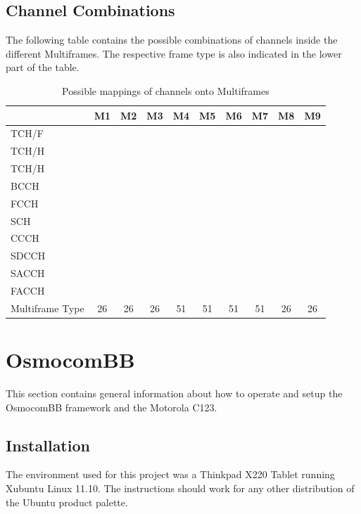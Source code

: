\newpage
\section{Channel Combinations}
\label{sec:combinations}
The following table contains the possible combinations of channels inside the different Multiframes.
The respective frame type is also indicated in the lower part of the table.
\begin{table}[h!]
\centering
\begin{tabular}{lccccccccc}
\toprule
					&M1&M2&M3&M4&M5&M6&M7&M8&M9\\
\midrule
TCH/F				&\cellcolor[gray]{0.7}&&&&&&&\cellcolor[gray]{0.7}&\cellcolor[gray]{0.7}\\
TCH/H				&&\cellcolor[gray]{0.7}&\cellcolor[gray]{0.7}&&&&&&\\
TCH/H				&&&\cellcolor[gray]{0.7}&&&&&&\\
BCCH				&&&&\cellcolor[gray]{0.7}&\cellcolor[gray]{0.7}&\cellcolor[gray]{0.7}&&&\\
FCCH				&&&&\cellcolor[gray]{0.7}&\cellcolor[gray]{0.7}&&&&\\
SCH					&&&&\cellcolor[gray]{0.7}&\cellcolor[gray]{0.7}&&&&\\
CCCH				&&&&\cellcolor[gray]{0.7}&\cellcolor[gray]{0.7}&\cellcolor[gray]{0.7}&&&\\
SDCCH				&&&&&\cellcolor[gray]{0.7}&&\cellcolor[gray]{0.7}&&\\
SACCH				&\cellcolor[gray]{0.7}&\cellcolor[gray]{0.7}&\cellcolor[gray]{0.7}&&\cellcolor[gray]{0.7}&&\cellcolor[gray]{0.7}&\cellcolor[gray]{0.7}&\cellcolor[gray]{0.7}\\
FACCH				&\cellcolor[gray]{0.7}&\cellcolor[gray]{0.7}&\cellcolor[gray]{0.7}&&&&&\cellcolor[gray]{0.7}&\\
\midrule
Multiframe Type		&26&26&26&51&51&51&51&26&26\\
\bottomrule
\end{tabular}
\caption{Possible mappings of channels onto Multiframes}
\end{table}

\chapter{OsmocomBB}
This section contains general information about how to operate and setup the OsmocomBB framework and the Motorola C123.
\section{Installation}
\label{sec:osmo_install}
The environment used for this project was a Thinkpad X220 Tablet running Xubuntu Linux 11.10.
The instructions should work for any other distribution of the Ubuntu product palette.

